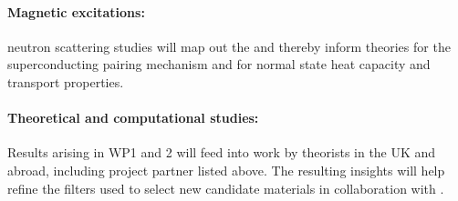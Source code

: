 
 

\paragraph{Magnetic excitations:}
neutron scattering studies will map out the  and thereby inform theories for the superconducting pairing mechanism and for normal state heat
capacity \cite{hayden00} and transport properties. 





\paragraph{Theoretical and computational studies:}
Results arising in WP1 and 2 will feed into work by theorists in the UK and abroad, including project partner  listed above. %
The resulting insights will help refine the filters used to select new candidate materials in collaboration with .

